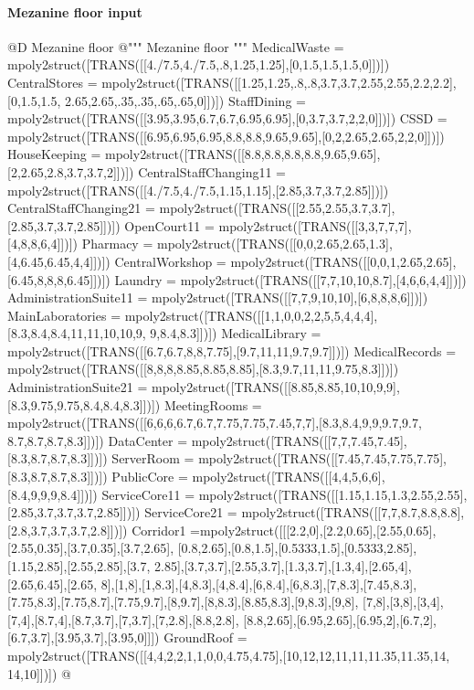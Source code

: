 \documentclass[11pt,oneside]{article}    %
\begin{document}
\paragraph{Mezanine floor input}

@D Mezanine floor
@{""" Mezanine floor """
MedicalWaste = mpoly2struct([TRANS([[4./7.5,4./7.5,.8,1.25,1.25],[0,1.5,1.5,1.5,0]])])
CentralStores = mpoly2struct([TRANS([[1.25,1.25,.8,.8,3.7,3.7,2.55,2.55,2.2,2.2],[0,1.5,1.5, 2.65,2.65,.35,.35,.65,.65,0]])])
StaffDining = mpoly2struct([TRANS([[3.95,3.95,6.7,6.7,6.95,6.95],[0,3.7,3.7,2,2,0]])])
CSSD = mpoly2struct([TRANS([[6.95,6.95,6.95,8.8,8.8,9.65,9.65],[0,2,2.65,2.65,2,2,0]])])
HouseKeeping = mpoly2struct([TRANS([[8.8,8.8,8.8,8.8,9.65,9.65],[2,2.65,2.8,3.7,3.7,2]])])
CentralStaffChanging11 = mpoly2struct([TRANS([[4./7.5,4./7.5,1.15,1.15],[2.85,3.7,3.7,2.85]])])
CentralStaffChanging21 = mpoly2struct([TRANS([[2.55,2.55,3.7,3.7],[2.85,3.7,3.7,2.85]])])
OpenCourt11 = mpoly2struct([TRANS([[3,3,7,7,7],[4,8,8,6,4]])])
Pharmacy = mpoly2struct([TRANS([[0,0,2.65,2.65,1.3],[4,6.45,6.45,4,4]])])
CentralWorkshop = mpoly2struct([TRANS([[0,0,1,2.65,2.65],[6.45,8,8,8,6.45]])])
Laundry = mpoly2struct([TRANS([[7,7,10,10,8.7],[4,6,6,4,4]])])
AdministrationSuite11 = mpoly2struct([TRANS([[7,7,9,10,10],[6,8,8,8,6]])])
MainLaboratories = mpoly2struct([TRANS([[1,1,0,0,2,2,5,5,4,4,4],[8.3,8.4,8.4,11,11,10,10,9, 9,8.4,8.3]])])
MedicalLibrary = mpoly2struct([TRANS([[6.7,6.7,8,8,7.75],[9.7,11,11,9.7,9.7]])])
MedicalRecords = mpoly2struct([TRANS([[8,8,8,8.85,8.85,8.85],[8.3,9.7,11,11,9.75,8.3]])])
AdministrationSuite21 = mpoly2struct([TRANS([[8.85,8.85,10,10,9,9],[8.3,9.75,9.75,8.4,8.4,8.3]])])
MeetingRooms = mpoly2struct([TRANS([[6,6,6,6.7,6.7,7.75,7.75,7.45,7,7],[8.3,8.4,9,9,9.7,9.7, 8.7,8.7,8.7,8.3]])])
DataCenter = mpoly2struct([TRANS([[7,7,7.45,7.45],[8.3,8.7,8.7,8.3]])])
ServerRoom = mpoly2struct([TRANS([[7.45,7.45,7.75,7.75],[8.3,8.7,8.7,8.3]])])
PublicCore = mpoly2struct([TRANS([[4,4,5,6,6],[8.4,9,9,9,8.4]])])
ServiceCore11 = mpoly2struct([TRANS([[1.15,1.15,1.3,2.55,2.55],[2.85,3.7,3.7,3.7,2.85]])])
ServiceCore21 = mpoly2struct([TRANS([[7,7,8.7,8.8,8.8],[2.8,3.7,3.7,3.7,2.8]])])
Corridor1 =mpoly2struct([[[2.2,0],[2.2,0.65],[2.55,0.65],[2.55,0.35],[3.7,0.35],[3.7,2.65],
[0.8,2.65],[0.8,1.5],[0.5333,1.5],[0.5333,2.85],[1.15,2.85],[2.55,2.85],[3.7,
2.85],[3.7,3.7],[2.55,3.7],[1.3,3.7],[1.3,4],[2.65,4],[2.65,6.45],[2.65,
8],[1,8],[1,8.3],[4,8.3],[4,8.4],[6,8.4],[6,8.3],[7,8.3],[7.45,8.3],
[7.75,8.3],[7.75,8.7],[7.75,9.7],[8,9.7],[8,8.3],[8.85,8.3],[9,8.3],[9,8],
[7,8],[3,8],[3,4],[7,4],[8.7,4],[8.7,3.7],[7,3.7],[7,2.8],[8.8,2.8],
[8.8,2.65],[6.95,2.65],[6.95,2],[6.7,2],[6.7,3.7],[3.95,3.7],[3.95,0]]])
GroundRoof = mpoly2struct([TRANS([[4,4,2,2,1,1,0,0,4.75,4.75],[10,12,12,11,11,11.35,11.35,14, 14,10]])])
@}
\end{document}
